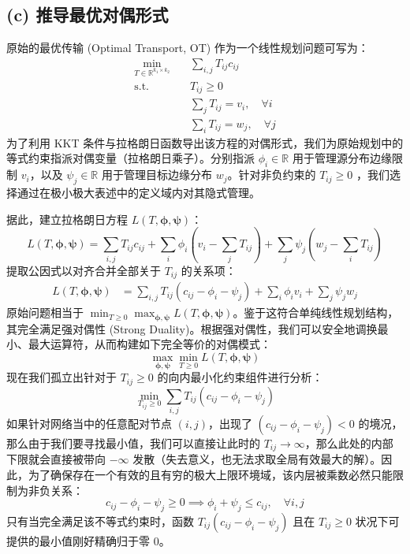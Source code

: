 \documentclass[11pt,UTF8]{ctexart}
\begin{document}
\subsection*{(c) 推导最优对偶形式}
原始的最优传输 (Optimal Transport, OT) 作为一个线性规划问题可写为：
\begin{align*}
    \min_{T \in \mathbb{R}^{k_1 \times k_2}} & \quad \sum_{i,j} T_{ij} c_{ij} \\
    \text{s.t.} & \quad T_{ij} \geq 0 \\
                & \quad \sum_{j} T_{ij} = v_i, \quad \forall i \\
                & \quad \sum_{i} T_{ij} = w_j, \quad \forall j
\end{align*}
为了利用 KKT 条件与拉格朗日函数导出该方程的对偶形式，我们为原始规划中的等式约束指派对偶变量（拉格朗日乘子）。分别指派 $\phi_i \in \mathbb{R}$ 用于管理源分布边缘限制 $v_i$，以及 $\psi_j \in \mathbb{R}$ 用于管理目标边缘分布 $w_j$。针对非负约束的 $T_{ij} \geq 0$ ，我们选择通过在极小极大表述中的定义域内对其隐式管理。

据此，建立拉格朗日方程 $L(T, \boldsymbol{\phi}, \boldsymbol{\psi})$：
\begin{equation}
    L(T, \boldsymbol{\phi}, \boldsymbol{\psi}) = \sum_{i,j} T_{ij} c_{ij} + \sum_{i} \phi_i \left( v_i - \sum_{j} T_{ij} \right) + \sum_{j} \psi_j \left( w_j - \sum_{i} T_{ij} \right)
\end{equation}
提取公因式以对齐合并全部关于 $T_{ij}$ 的关系项：
\begin{align*}
    L(T, \boldsymbol{\phi}, \boldsymbol{\psi}) &= \sum_{i,j} T_{ij} (c_{ij} - \phi_i - \psi_j) + \sum_{i} \phi_i v_i + \sum_{j} \psi_j w_j
\end{align*}
原始问题相当于 $\min_{T \geq 0} \max_{\boldsymbol{\phi}, \boldsymbol{\psi}} L(T, \boldsymbol{\phi}, \boldsymbol{\psi})$。鉴于这符合单纯线性规划结构，其完全满足强对偶性 (Strong Duality)。根据强对偶性，我们可以安全地调换最小、最大运算符，从而构建如下完全等价的对偶模式：
\begin{equation}
    \max_{\boldsymbol{\phi}, \boldsymbol{\psi}} \min_{T \ge 0} L(T, \boldsymbol{\phi}, \boldsymbol{\psi})
\end{equation}
现在我们孤立出针对于 $T_{ij} \geq 0$ 的向内最小化约束组件进行分析：
\begin{equation}
    \min_{T_{ij} \geq 0} \sum_{i,j} T_{ij} (c_{ij} - \phi_i - \psi_j)
\end{equation}
如果针对网络当中的任意配对节点 $(i, j)$，出现了 $(c_{ij} - \phi_i - \psi_j) < 0$ 的境况，那么由于我们要寻找最小值，我们可以直接让此时的 $T_{ij} \to \infty$，那么此处的内部下限就会直接被带向 $-\infty$ 发散（失去意义，也无法求取全局有效最大的解）。因此，为了确保存在一个有效的且有穷的极大上限环境域，该内层被乘数必然只能限制为非负关系：
\begin{equation}
    c_{ij} - \phi_i - \psi_j \geq 0 \implies \phi_i + \psi_j \leq c_{ij}, \quad \forall i, j
\end{equation}
只有当完全满足该不等式约束时，函数 $T_{ij} (c_{ij} - \phi_i - \psi_j)$ 且在 $T_{ij} \geq 0$ 状况下可提供的最小值刚好精确归于零 0。
\end{document}

